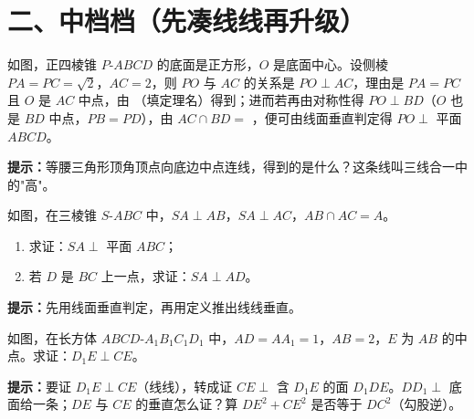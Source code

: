 \documentclass{exam-zh}
\begin{document}
\section*{二、中档档（先凑线线再升级）}


\begin{question}[points=5]
  如图，正四棱锥 $P\text{-}ABCD$ 的底面是正方形，$O$ 是底面中心。设侧棱 $PA=PC=\sqrt{2}$，$AC=2$，则 $PO$ 与 $AC$ 的关系是 $PO\perp AC$，理由是 $PA=PC$ 且 $O$ 是 $AC$ 中点，由 \underline{\quad\quad\quad\quad\quad\quad}（填定理名）得到；进而若再由对称性得 $PO\perp BD$（$O$ 也是 $BD$ 中点，$PB=PD$），由 $AC\cap BD=$ \underline{\quad}，便可由线面垂直判定得 $PO\perp$ 平面 $ABCD$。
  \begin{hintbox}
\textbf{提示：}等腰三角形顶角顶点向底边中点连线，得到的是什么？这条线叫三线合一中的"高"。\end{hintbox}

\end{question}



\begin{problem}[points=9]
    如图，在三棱锥 $S\text{-}ABC$ 中，$SA\perp AB$，$SA\perp AC$，$AB\cap AC=A$。
\begin{enumerate}[label=(\arabic*)]
  \item 求证：$SA\perp$ 平面 $ABC$；
  \item 若 $D$ 是 $BC$ 上一点，求证：$SA\perp AD$。
\end{enumerate}

    \begin{hintbox}
\textbf{提示：}先用线面垂直判定，再用定义推出线线垂直。\end{hintbox}

  \answerarea[56mm]
\end{problem}



\begin{problem}[points=9]
    如图，在长方体 $ABCD\text{-}A_1B_1C_1D_1$ 中，$AD=AA_1=1$，$AB=2$，$E$ 为 $AB$ 的中点。求证：$D_1E\perp CE$。

    \begin{hintbox}
\textbf{提示：}要证 $D_1E\perp CE$（线线），转成证 $CE\perp$ 含 $D_1E$ 的面 $D_1DE$。$DD_1\perp$ 底面给一条；$DE$ 与 $CE$ 的垂直怎么证？算 $DE^2+CE^2$ 是否等于 $DC^2$（勾股逆）。\end{hintbox}

  \answerarea[48mm]
\end{problem}
\end{document}
